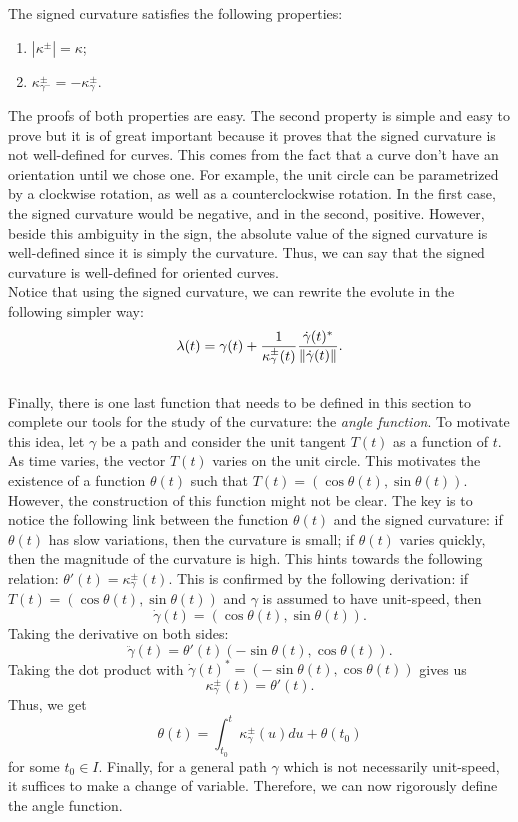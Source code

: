 \begin{proposition}
    The signed curvature satisfies the following properties:
    \begin{enumerate}
        \item $|\kappa^{\pm}| = \kappa$;
        \item $\kappa_{\gamma^-}^{\pm} = -\kappa_{\gamma}^{\pm}$.
    \end{enumerate}
\end{proposition}

The proofs of both properties are easy. The second property is simple and easy to prove but it is of great important because it proves that the signed curvature is not well-defined for curves. This comes from the fact that a curve don't have an orientation until we chose one. For example, the unit circle can be parametrized by a clockwise rotation, as well as a counterclockwise rotation. In the first case, the signed curvature would be negative, and in the second, positive. However, beside this ambiguity in the sign, the absolute value of the signed curvature is well-defined since it is simply the curvature. Thus, we can say that the signed curvature is well-defined for oriented curves. \\

Notice that using the signed curvature, we can rewrite the evolute in the following simpler way:
$$\lambda(t) = \gamma(t) + \frac{1}{\kappa_{\gamma}^{\pm}(t)}\frac{\dot{\gamma}(t)^*}{\left\lVert\dot{\gamma}(t) \right\rVert}.$$\\

Finally, there is one last function that needs to be defined in this section to complete our tools for the study of the curvature: the \textit{angle function}. To motivate this idea, let $\gamma$ be a path and consider the unit tangent $T(t)$ as a function of $t$. As time varies, the vector $T(t)$ varies on the unit circle. This motivates the existence of a function $\theta(t)$ such that $T(t) = (\cos\theta(t), \sin\theta(t))$. However, the construction of this function might not be clear. The key is to notice the following link between the function $\theta(t)$ and the signed curvature: if $\theta(t)$ has slow variations, then the curvature is small; if $\theta(t)$ varies quickly, then the magnitude of the curvature is high. This hints towards the following relation: $\theta'(t) = \kappa_{\gamma}^{\pm}(t)$. This is confirmed by the following derivation: if $T(t) = (\cos \theta(t), \sin \theta(t))$ and $\gamma$ is assumed to have unit-speed, then
$$\dot{\gamma}(t) = (\cos \theta(t), \sin \theta(t)).$$
Taking the derivative on both sides:
$$\ddot{\gamma}(t) = \theta'(t) (-\sin \theta(t), \cos \theta(t)).$$
Taking the dot product with $\dot{\gamma}(t)^* = (-\sin \theta(t), \cos \theta(t))$ gives us
$$\kappa_{\gamma}^{\pm}(t) = \theta'(t).$$
Thus, we get
$$\theta(t) = \int_{t_0}^{t}\kappa_{\gamma}^{\pm}(u)du + \theta(t_0)$$
for some $t_0 \in I$. Finally, for a general path $\gamma$ which is not necessarily unit-speed, it suffices to make a change of variable. Therefore, we can now rigorously define the angle function.

